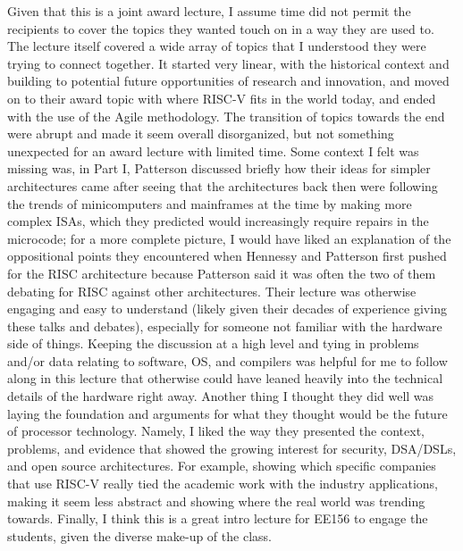 \documentclass [12pt]{article}
\begin{document}
        Given that this is a joint award lecture, I assume time did not permit the recipients to cover the topics they wanted touch on in a way they are used to. The lecture itself covered a wide array of topics that I understood they were trying to connect together. It started very linear, with the historical context and building to potential future opportunities of research and innovation, and moved on to their award topic with where RISC-V fits in the world today, and ended with the use of the Agile methodology. The transition of topics towards the end were abrupt and made it seem overall disorganized, but not something unexpected for an award lecture with limited time. Some context I felt was missing was, in Part I, Patterson discussed briefly how their ideas for simpler architectures came after seeing that the architectures back then were following the trends  of minicomputers and mainframes at the time by making more complex ISAs, which they predicted would increasingly require repairs in the microcode; for a more complete picture, I would have liked an explanation of the oppositional points they encountered when Hennessy and Patterson first pushed for the RISC architecture because Patterson said it was often the two of them debating for RISC against other architectures. Their lecture was otherwise engaging and easy to understand (likely given their decades of experience giving these talks and debates), especially for someone not familiar with the hardware side of things. Keeping the discussion at a high level and tying in problems and/or data relating to software, OS, and compilers was helpful for me to follow along in this lecture that otherwise could have leaned heavily into the technical details of the hardware right away. Another thing I thought they did well was laying the foundation and arguments for what they thought would be the future of processor technology. Namely, I liked the way they presented the context, problems, and evidence that showed the growing interest for security, DSA/DSLs, and open source architectures. For example, showing which specific companies  that use RISC-V really tied the academic work with the industry applications, making it seem less abstract and showing where the real world was trending towards. Finally, I think this is a great intro lecture for EE156 to engage the students, given the diverse make-up of the class.


\end{document}
